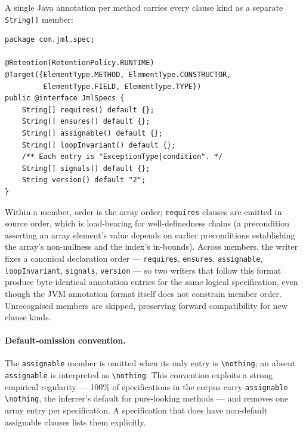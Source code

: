 A single Java annotation per method carries every clause kind as a separate
\texttt{String[]} member:

\begin{lstlisting}
package com.jml.spec;

@Retention(RetentionPolicy.RUNTIME)
@Target({ElementType.METHOD, ElementType.CONSTRUCTOR,
         ElementType.FIELD, ElementType.TYPE})
public @interface JmlSpecs {
    String[] requires() default {};
    String[] ensures() default {};
    String[] assignable() default {};
    String[] loopInvariant() default {};
    /** Each entry is "ExceptionType|condition". */
    String[] signals() default {};
    String version() default "2";
}
\end{lstlisting}

Within a member, order is the array order; \texttt{requires} clauses are emitted
in source order, which is load-bearing for well-definedness chains (a
precondition asserting an array element's value depends on earlier preconditions
establishing the array's non-nullness and the index's in-bounds). Across
members, the writer fixes a canonical declaration order ---
\texttt{requires}, \texttt{ensures}, \texttt{assignable}, \texttt{loopInvariant},
\texttt{signals}, \texttt{version} --- so two writers that follow this format
produce byte-identical annotation entries for the same logical specification,
even though the JVM annotation format itself does not constrain member order.
Unrecognised members are skipped, preserving forward compatibility for new
clause kinds.

\paragraph{Default-omission convention.}
The \texttt{assignable} member is omitted when its only entry is
\texttt{\textbackslash nothing}; an absent \texttt{assignable} is interpreted as
\texttt{\textbackslash nothing}. This convention exploits a strong empirical
regularity --- 100\% of specifications in the corpus carry
\texttt{assignable \textbackslash nothing}, the inferrer's default for
pure-looking methods --- and removes one array entry per specification. A
specification that does have non-default assignable clauses lists them
explicitly.

